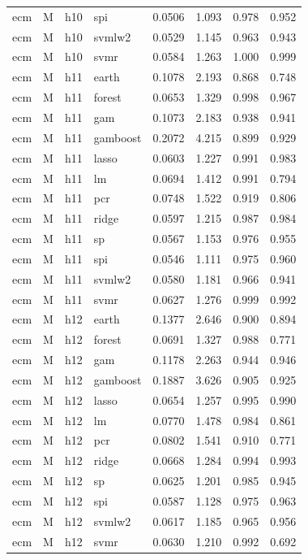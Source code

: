 \begin{ThreePartTable}
\begin{longtable}[t]{llclcccc}
ecm & M & h10 & spi & 0.0506 & 1.093 & 0.978 & 0.952\\
ecm & M & h10 & svmlw2 & 0.0529 & 1.145 & 0.963 & 0.943\\
ecm & M & h10 & svmr & 0.0584 & 1.263 & 1.000 & 0.999\\
\addlinespace
ecm & M & h11 & earth & 0.1078 & 2.193 & 0.868 & 0.748\\
ecm & M & h11 & forest & 0.0653 & 1.329 & 0.998 & 0.967\\
ecm & M & h11 & gam & 0.1073 & 2.183 & 0.938 & 0.941\\
ecm & M & h11 & gamboost & 0.2072 & 4.215 & 0.899 & 0.929\\
ecm & M & h11 & lasso & 0.0603 & 1.227 & 0.991 & 0.983\\
ecm & M & h11 & lm & 0.0694 & 1.412 & 0.991 & 0.794\\
ecm & M & h11 & pcr & 0.0748 & 1.522 & 0.919 & 0.806\\
ecm & M & h11 & ridge & 0.0597 & 1.215 & 0.987 & 0.984\\
ecm & M & h11 & sp & 0.0567 & 1.153 & 0.976 & 0.955\\
ecm & M & h11 & spi & 0.0546 & 1.111 & 0.975 & 0.960\\
ecm & M & h11 & svmlw2 & 0.0580 & 1.181 & 0.966 & 0.941\\
ecm & M & h11 & svmr & 0.0627 & 1.276 & 0.999 & 0.992\\
\addlinespace
ecm & M & h12 & earth & 0.1377 & 2.646 & 0.900 & 0.894\\
ecm & M & h12 & forest & 0.0691 & 1.327 & 0.988 & 0.771\\
ecm & M & h12 & gam & 0.1178 & 2.263 & 0.944 & 0.946\\
ecm & M & h12 & gamboost & 0.1887 & 3.626 & 0.905 & 0.925\\
ecm & M & h12 & lasso & 0.0654 & 1.257 & 0.995 & 0.990\\
ecm & M & h12 & lm & 0.0770 & 1.478 & 0.984 & 0.861\\
ecm & M & h12 & pcr & 0.0802 & 1.541 & 0.910 & 0.771\\
ecm & M & h12 & ridge & 0.0668 & 1.284 & 0.994 & 0.993\\
ecm & M & h12 & sp & 0.0625 & 1.201 & 0.985 & 0.945\\
ecm & M & h12 & spi & 0.0587 & 1.128 & 0.975 & 0.963\\
ecm & M & h12 & svmlw2 & 0.0617 & 1.185 & 0.965 & 0.956\\
ecm & M & h12 & svmr & 0.0630 & 1.210 & 0.992 & 0.692\\

\end{longtable}
\end{ThreePartTable}
